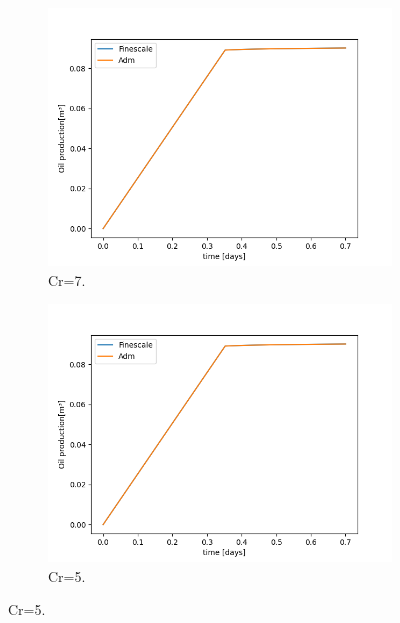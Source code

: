 \documentclass[professionalfont]{beamer}
\begin{document}
\begin{frame}{\FrameProblemName}
    \begin{figure}[!htbp]
        \centering
        \caption{Curvas de produção.}
        \begin{subfigure}{.48\textwidth}
            \centering
            \includegraphics[scale=0.4]{./imgs/pr4/oil_prod_cr7.png}
            \caption{Cr=7.}
        \end{subfigure}
        \hfill
        \begin{subfigure}{.48\textwidth}
            \centering
            \includegraphics[scale=0.4]{./imgs/pr4/oil_prod_cr5.png}
            \caption{Cr=5.}
        \end{subfigure}
        \label{fig:fig5_pr4}
    \end{figure}
\end{frame}
\end{document}
